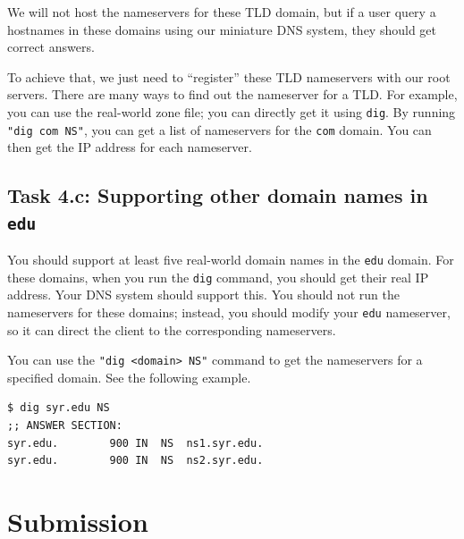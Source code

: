 We will not host the nameservers for these TLD domain, but 
if a user query a hostnames in these domains using our miniature
DNS system, they should get correct answers.  

To achieve that, we just need to ``register'' these TLD nameservers
with our root servers. 
There are many ways to find out the nameserver for a TLD. For example,
you can use the real-world zone file; you can directly
get it using \texttt{dig}. By running \texttt{"dig com NS"}, you
can get a list of nameservers for the \texttt{com} domain.
You can then get the IP address for each nameserver. 




\subsection{Task 4.c: Supporting other domain names in \texttt{edu}}


You should support at least five real-world domain names 
in the \texttt{edu} domain. For these domains, when you run
the \texttt{dig} command, you should get their real IP address. Your
DNS system should support this. You should not run 
the nameservers for these domains; instead, you should modify
your \texttt{edu} nameserver, so it can direct the client
to the corresponding nameservers. 


You can use the \texttt{"dig <domain> NS"} command to get the nameservers
for a specified domain. See the following example. 

\begin{lstlisting}
$ dig syr.edu NS 
;; ANSWER SECTION:
syr.edu.		900	IN	NS	ns1.syr.edu.
syr.edu.		900	IN	NS	ns2.syr.edu.
\end{lstlisting}
 

 





\section{Submission}






